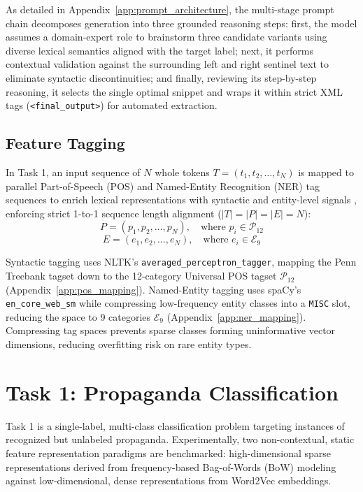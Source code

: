 \documentclass[12pt, a4paper]{article}
\begin{document}
As detailed in Appendix~\ref{app:prompt_architecture}, the multi-stage prompt chain decomposes generation into three grounded reasoning steps: first, the model assumes a domain-expert role to brainstorm three candidate variants using diverse lexical semantics aligned with the target label; next, it performs contextual validation against the surrounding left and right sentinel text to eliminate syntactic discontinuities; and finally, reviewing its step-by-step reasoning, it selects the single optimal snippet and wraps it within strict XML tags (\texttt{<final\_output>}) for automated extraction.

\subsection{Feature Tagging}
\label{subsec:feature_tagging}

In Task 1, an input sequence of $N$ whole tokens $T = (t_1, t_2, \dots, t_N)$ is mapped to parallel Part-of-Speech (POS) and Named-Entity Recognition (NER) tag sequences to enrich lexical representations with syntactic and entity-level signals \cite{khosla2020}, enforcing strict 1-to-1 sequence length alignment ($\vert T \vert = \vert P \vert = \vert E \vert = N$):
$$P = (p_1, p_2, \dots, p_N), \quad \text{where } p_i \in \mathcal{P}_{12}$$
$$E = (e_1, e_2, \dots, e_N), \quad \text{where } e_i \in \mathcal{E}_{9}$$

Syntactic tagging uses NLTK's \texttt{averaged\_perceptron\_tagger}, mapping the Penn Treebank tagset down to the 12-category Universal POS tagset $\mathcal{P}_{12}$ (Appendix~\ref{app:pos_mapping}). Named-Entity tagging uses spaCy's \texttt{en\_core\_web\_sm} while compressing low-frequency entity classes into a \texttt{MISC} slot, reducing the space to 9 categories $\mathcal{E}_{9}$ (Appendix~\ref{app:ner_mapping}). Compressing tag spaces prevents sparse classes forming uninformative vector dimensions, reducing overfitting risk on rare entity types.



\newpage
\section{Task 1: Propaganda Classification}
\label{sec:task1}

Task 1 is a single-label, multi-class classification problem targeting instances of recognized but unlabeled propaganda. Experimentally, two non-contextual, static feature representation paradigms are benchmarked: high-dimensional sparse representations derived from frequency-based Bag-of-Words (BoW) modeling against low-dimensional, dense representations from Word2Vec embeddings.
\end{document}
